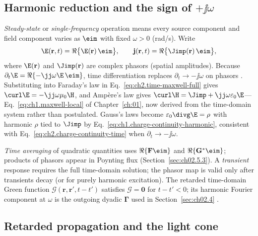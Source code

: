 \subsection[Harmonic reduction and the sign of \texorpdfstring{$+\jj\omega$}{+j omega}]{Harmonic reduction and the sign of $+\jj\omega$}
\label{sec:ch02.2.4}

\emph{Steady-state} or \emph{single-frequency} operation means every source component and field component varies as $\eim$ with fixed $\omega>0$ (rad/s). Write
\begin{equation}
\label{eq:ch2.harmonic-ansatz}
\E(\mathbf{r},t)=\Re\big\{\E(\mathbf{r})\,\eim\big\},
\qquad
\mathbf{j}(\mathbf{r},t)=\Re\big\{\Jimp(\mathbf{r})\,\eim\big\},
\end{equation}
where $\E(\mathbf{r})$ and $\Jimp(\mathbf{r})$ are complex phasors (spatial amplitudes). Because $\partial_t\E=\Re\{-\jj\omega\E\,\eim\}$, time differentiation replaces $\partial_t\to-\jj\omega$ on phasors \cite{stratton1941}. Substituting into Faraday's law in Eq.~\eqref{eq:ch2.time-maxwell-full} gives $\curl\E=-\jj\omega\mu_0\H$, and Amp\`ere's law gives $\curl\H=\Jimp+\jj\omega\varepsilon_0\E$---Eq.~\eqref{eq:ch1.maxwell-local} of Chapter~\ref{ch:01}, now derived from the time-domain system rather than postulated. Gauss's laws become $\varepsilon_0\divg\E=\rho$ with harmonic $\rho$ tied to $\Jimp$ by Eq.~\eqref{eq:ch1.charge-continuity-harmonic}, consistent with Eq.~\eqref{eq:ch2.charge-continuity-time} when $\partial_t\to-\jj\omega$.

\emph{Time averaging} of quadratic quantities uses $\Re\{\mathbf{F}\eim\}$ and $\Re\{\mathbf{G}^*\eim\}$; products of phasors appear in Poynting flux (Section~\ref{sec:ch02.5.3}). A \emph{transient} response requires the full time-domain solution; the phasor map is valid only after transients decay (or for purely harmonic excitation). The retarded time-domain Green function $\boldsymbol{\mathcal{G}}(\mathbf{r},\mathbf{r}',t-t')$ satisfies $\boldsymbol{\mathcal{G}}=\mathbf{0}$ for $t-t'<0$; its harmonic Fourier component at $\omega$ is the outgoing dyadic $\boldsymbol{\Gamma}$ used in Section~\ref{sec:ch02.4} \cite{stratton1941,jackson1999}.

\subsection{Retarded propagation and the light cone}
\label{sec:ch02.2.5}

